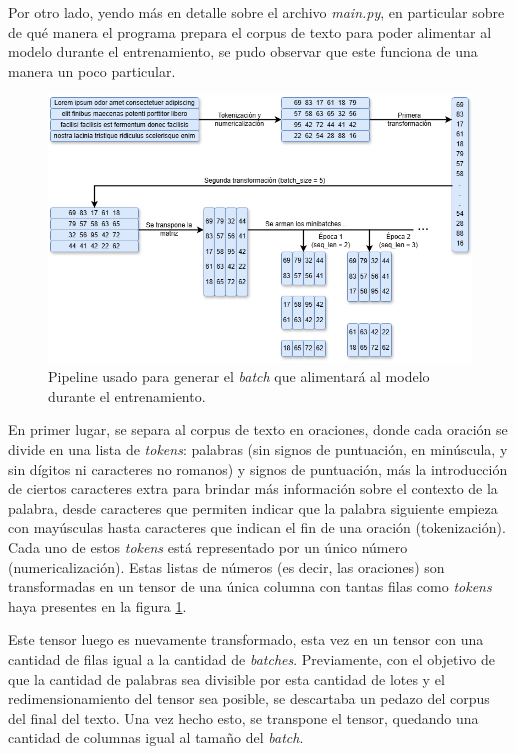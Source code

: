 Por otro lado, yendo más en detalle sobre el archivo \textit{main.py}, en particular sobre de qué manera el programa prepara el corpus de texto para poder alimentar al modelo durante el entrenamiento, se pudo observar que este funciona de una manera un poco particular.

\begin{figure}[H]
    \centering
    \includegraphics[width=1\textwidth]{imagenes/armado_texto.png}
    \caption{Pipeline usado para generar el \textit{batch} que alimentará al modelo durante el entrenamiento.}
    \label{fig:armado_texto}
\end{figure}

En primer lugar, se separa al corpus de texto en oraciones, donde cada oración se divide en una lista de \textit{tokens}: palabras (sin signos de puntuación, en minúscula, y sin dígitos ni caracteres no romanos) y signos de puntuación, más la introducción de ciertos caracteres extra para brindar más información sobre el contexto de la palabra, desde caracteres que permiten indicar que la palabra siguiente empieza con mayúsculas hasta caracteres que indican el fin de una oración (tokenización). Cada uno de estos \textit{tokens} está representado por un único número (numericalización). Estas listas de números (es decir, las oraciones) son transformadas en un tensor de una única columna con tantas filas como \textit{tokens} haya presentes en la figura \ref{fig:armado_texto}.

Este tensor luego es nuevamente transformado, esta vez en un tensor con una cantidad de filas igual a la cantidad de \textit{batches}. Previamente, con el objetivo de que la cantidad de palabras sea divisible por esta cantidad de lotes y el redimensionamiento del tensor sea posible, se descartaba un pedazo del corpus del final del texto. Una vez hecho esto, se transpone el tensor, quedando una cantidad de columnas igual al tamaño del \textit{batch}.

